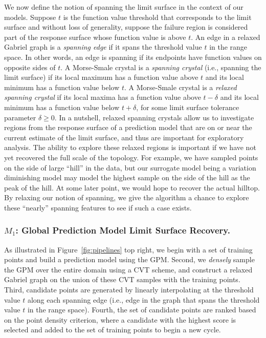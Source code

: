 We now define the notion of spanning the limit surface in the context of our models.
%
Suppose $t$ is the function value threshold that corresponds to the limit surface and without loss of generality, suppose the failure region is considered part of the response surface whose function value is above $t$.
%
An edge in a relaxed Gabriel graph is a \emph{spanning edge} if it spans the threshold value $t$ in the range space.
%
In other words, an edge is spanning if its endpoints have function values on opposite sides of $t$.
%
A Morse-Smale crystal is a \emph{spanning crystal} (i.e., spanning the limit surface) if its local maximum has a function value above $t$ and its local minimum has a function value below $t$.
%
A Morse-Smale crystal is a \emph{relaxed spanning crystal} if its local maxima has a function value above $t-\delta$ and its local minimum has a function value below $t+\delta$, for some limit surface tolerance parameter $\delta \geq 0$.
%
In a nutshell, relaxed spanning crystals allow us to investigate regions from the response surface of a prediction model that are on or near the current estimate of the limit surface, and thus are important for exploratory analysis.
%
The ability to explore these relaxed regions is important if we have not yet recovered the full scale of the topology.
%
For example, we have sampled points on the side of large ``hill'' in the data, but our surrogate model being a variation diminishing model may model the highest sample on the side of the hill as the peak of the hill.
%
At some later point, we would hope to recover the actual hilltop.
%
By relaxing our notion of spanning, we give the algorithm a chance to explore these ``nearly'' spanning features to see if such a case exists.
%

\subsubsection{$M_1$: Global Prediction Model Limit Surface Recovery.}
As illustrated in Figure~\ref{fig:pipelines} top right, we begin with a set of training points and build a prediction model using the GPM.
%
Second, we \emph{densely} sample the GPM over the entire domain using a CVT scheme, and construct a relaxed Gabriel graph on the union of these CVT samples with the training points.
%
Third, candidate points are generated by linearly interpolating at the threshold value $t$ along each spanning edge (i.e., edge in the graph that spans the threshold value $t$ in the range space).
%
Fourth, the set of candidate points are ranked based on the point density criterion, where a candidate with the highest score is selected and added to the set of training points to begin a new cycle.


